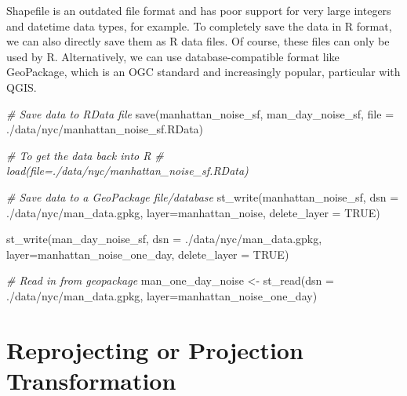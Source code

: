 \documentclass[
  11pt,
]{book}
\newenvironment{Shaded}{\begin{snugshade}}{\end{snugshade}}
\newcommand{\AttributeTok}[1]{\textcolor[rgb]{0.77,0.63,0.00}{#1}}
\newcommand{\CommentTok}[1]{\textcolor[rgb]{0.56,0.35,0.01}{\textit{#1}}}
\newcommand{\ConstantTok}[1]{\textcolor[rgb]{0.00,0.00,0.00}{#1}}
\newcommand{\FunctionTok}[1]{\textcolor[rgb]{0.00,0.00,0.00}{#1}}
\newcommand{\NormalTok}[1]{#1}
\newcommand{\OtherTok}[1]{\textcolor[rgb]{0.56,0.35,0.01}{#1}}
\newcommand{\StringTok}[1]{\textcolor[rgb]{0.31,0.60,0.02}{#1}}
\begin{document}
Shapefile is an outdated file format and has poor support for very large integers and datetime data types, for example. To completely save the data in R format, we can also directly save them as R data files. Of course, these files can only be used by R. Alternatively, we can use database-compatible format like GeoPackage, which is an OGC standard and increasingly popular, particular with QGIS.

\begin{Shaded}
\begin{Highlighting}[]
\CommentTok{\# Save data to RData file}
\FunctionTok{save}\NormalTok{(manhattan\_noise\_sf, man\_day\_noise\_sf, }
     \AttributeTok{file =} \StringTok{\textquotesingle{}./data/nyc/manhattan\_noise\_sf.RData\textquotesingle{}}\NormalTok{)}

\CommentTok{\# To get the data back into R}
\CommentTok{\# load(file=\textquotesingle{}./data/nyc/manhattan\_noise\_sf.RData\textquotesingle{})}

\CommentTok{\# Save data to a GeoPackage file/database}
\FunctionTok{st\_write}\NormalTok{(manhattan\_noise\_sf, }
         \AttributeTok{dsn =} \StringTok{\textquotesingle{}./data/nyc/man\_data.gpkg\textquotesingle{}}\NormalTok{, }
         \AttributeTok{layer=}\StringTok{\textquotesingle{}manhattan\_noise\textquotesingle{}}\NormalTok{,}
         \AttributeTok{delete\_layer =} \ConstantTok{TRUE}\NormalTok{)}

\FunctionTok{st\_write}\NormalTok{(man\_day\_noise\_sf,          }
         \AttributeTok{dsn =} \StringTok{\textquotesingle{}./data/nyc/man\_data.gpkg\textquotesingle{}}\NormalTok{, }
         \AttributeTok{layer=}\StringTok{\textquotesingle{}manhattan\_noise\_one\_day\textquotesingle{}}\NormalTok{,}
         \AttributeTok{delete\_layer =} \ConstantTok{TRUE}\NormalTok{)}

\CommentTok{\# Read in from geopackage}
\NormalTok{man\_one\_day\_noise }\OtherTok{\textless{}{-}} \FunctionTok{st\_read}\NormalTok{(}\AttributeTok{dsn =} \StringTok{\textquotesingle{}./data/nyc/man\_data.gpkg\textquotesingle{}}\NormalTok{, }
        \AttributeTok{layer=}\StringTok{\textquotesingle{}manhattan\_noise\_one\_day\textquotesingle{}}\NormalTok{)}
\end{Highlighting}
\end{Shaded}

\hypertarget{reprojecting-or-projection-transformation}{%
\section{Reprojecting or Projection Transformation}\label{reprojecting-or-projection-transformation}}
\end{document}
